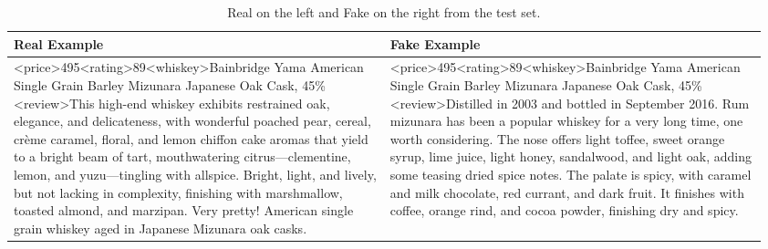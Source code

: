 \documentclass{article}
\begin{document}
\begin{table}[h]
    \centering
    \begin{tabular}{p{0.48\linewidth} | p{0.48\linewidth}}
        \toprule
        \textbf{Real Example} & \textbf{Fake Example} \\
        \midrule
        <price>495<rating>89<whiskey>Bainbridge Yama American Single Grain Barley Mizunara Japanese Oak Cask, 45\%<review>This high-end whiskey exhibits restrained oak, elegance, and delicateness, with wonderful poached pear, cereal, crème caramel, floral, and lemon chiffon cake aromas that yield to a bright beam of tart, mouthwatering citrus—clementine, lemon, and yuzu—tingling with allspice. Bright, light, and lively, but not lacking in complexity, finishing with marshmallow, toasted almond, and marzipan. Very pretty! American single grain whiskey aged in Japanese Mizunara oak casks.
        &
        <price>495<rating>89<whiskey>Bainbridge Yama American Single Grain Barley Mizunara Japanese Oak Cask, 45\%<review>Distilled in 2003 and bottled in September 2016. Rum mizunara has been a popular whiskey for a very long time, one worth considering. The nose offers light toffee, sweet orange syrup, lime juice, light honey, sandalwood, and light oak, adding some teasing dried spice notes. The palate is spicy, with caramel and milk chocolate, red currant, and dark fruit. It finishes with coffee, orange rind, and cocoa powder, finishing dry and spicy.  \\
        \bottomrule
    \end{tabular}
    \vspace{1em}
    \caption{Real on the left and Fake on the right from the test set.}
    \label{reviewstable}
\end{table}




\end{document}
